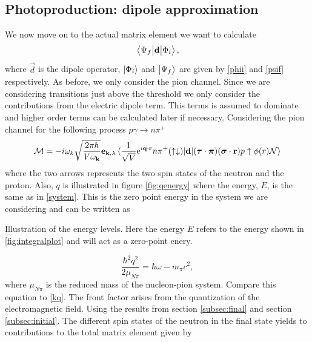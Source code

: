 \subsection{Photoproduction: dipole approximation}\label{sec:dipoles}
We now move on to the actual matrix element we want to calculate 
\begin{equation}
    \mel{\Psi_f}{\bm{\mathrm{d}}}{\Phi_i},
\end{equation}
where $\vec{d}$ is the dipole operator, $\ket{\Phi_i}$ and $\ket{\Psi_f}$ are given by \eqref{phii} and \eqref{psif} respectively. As before, we only consider the pion channel. Since we are considering transitions just above the threshold we only consider the contributions from the electric dipole term. This terms is assumed to dominate and higher order terms can be calculated later if necessary. Considering the pion channel for the following process $p \gamma \rightarrow n\pi^+$
\begin{equation}
    \mathcal{M}=-i\omega_k\sqrt{\frac{2\pi\hbar}{V\omega_{\bm{\mathrm{k}}}}}\bm{\mathrm{e}}_{\bm{\mathrm{k}},\lambda}\mel*{\frac{1}{\sqrt{V}}\text{e}^{i\bm{\mathrm{q}}\cdot \bm{\mathrm{r}}}n\pi^+ (\uparrow \downarrow)}{\bm{\mathrm{d}}}{(\bm{\mathrm{\tau}}\cdot \bm{\mathrm{\pi}})(\bm{\mathrm{\sigma}}\cdot \bm{\mathrm{r}})p\uparrow \phi(r)\mathcal{N}}
\end{equation}
where the two arrows represents the two spin states of the neutron and the proton. Also, $q$ is illustrated in figure \ref{fig:qenergy} where the energy, $E$, is the same as in \eqref{system}. This is the zero point energy in the system we are considering and can be written as 
\begin{marginfigure}
\centering

\caption{Illustration of the energy levels. Here the energy $E$ refers to the energy shown in \ref{fig:integralplot} and will act as a zero-point enery.}
\label{fig:qenergy}
\end{marginfigure}  
\begin{equation}
    \frac{\hbar^2 q^2}{2\mu_{N\pi}} = \hbar \omega-m_\pi c^2,
\end{equation}
where $\mu_{N\pi}$ is the reduced mass of the nucleon-pion system. Compare this equation to \eqref{kq}. The front factor arises from the quantization of the electromagnetic field. Using the results from section \ref{subsec:final} and section \ref{subsec:initial}. The different spin states of the neutron in the final state yields to contributions to the total matrix element given by
